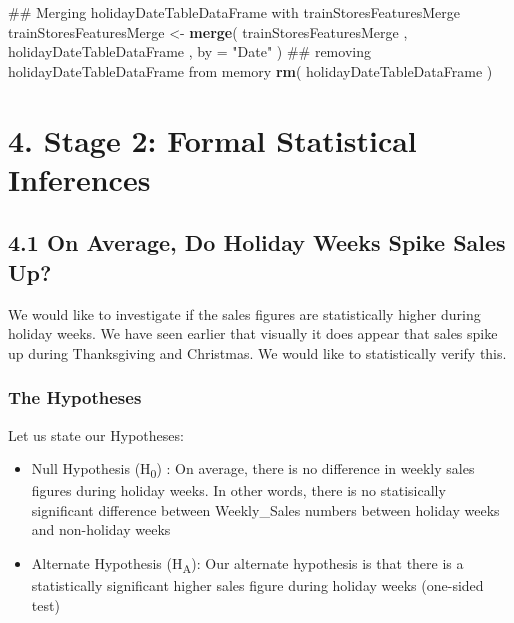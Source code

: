 \documentclass[]{article}
\newenvironment{Shaded}{\begin{snugshade}}{\end{snugshade}}
\newcommand{\KeywordTok}[1]{\textcolor[rgb]{0.13,0.29,0.53}{\textbf{{#1}}}}
\newcommand{\DataTypeTok}[1]{\textcolor[rgb]{0.13,0.29,0.53}{{#1}}}
\newcommand{\StringTok}[1]{\textcolor[rgb]{0.31,0.60,0.02}{{#1}}}
\newcommand{\NormalTok}[1]{{#1}}
\begin{document}
\begin{Shaded}
\begin{Highlighting}[]
\NormalTok{## Merging holidayDateTableDataFrame with trainStoresFeaturesMerge}
\NormalTok{trainStoresFeaturesMerge <-}\StringTok{ }
\StringTok{  }\KeywordTok{merge}\NormalTok{( trainStoresFeaturesMerge , holidayDateTableDataFrame , }\DataTypeTok{by =} \StringTok{"Date"} \NormalTok{)}
\NormalTok{## removing holidayDateTableDataFrame from memory}
\KeywordTok{rm}\NormalTok{( holidayDateTableDataFrame )}
\end{Highlighting}
\end{Shaded}

\pagebreak
\hfill \break
\hfill \break
\hfill \break
\hfill \break
\hfill \break
\hfill \break
\hfill \break
\hfill \break
\hfill \break
\hfill \break
\hfill \break
\hfill \break
\hfill \break
\hfill \break
\hfill \break
\hfill \break
\hfill \break
\hfill \break
\hfill \break
\hfill \break

\section{4. Stage 2: Formal Statistical
Inferences}\label{stage-2-formal-statistical-inferences}

\subsection{4.1 On Average, Do Holiday Weeks Spike Sales
Up?}\label{on-average-do-holiday-weeks-spike-sales-up}

We would like to investigate if the sales figures are statistically
higher during holiday weeks. We have seen earlier that visually it does
appear that sales spike up during Thanksgiving and Christmas. We would
like to statistically verify this.

\subsubsection{The Hypotheses}\label{the-hypotheses}

Let us state our Hypotheses:

\begin{itemize}
\itemsep1pt\parskip0pt
\item
  Null Hypothesis (H\textsubscript{0}) : On average, there is no
  difference in weekly sales figures during holiday weeks. In other
  words, there is no statisically significant difference between
  Weekly\_Sales numbers between holiday weeks and non-holiday weeks
\item
  Alternate Hypothesis (H\textsubscript{A}): Our alternate hypothesis is
  that there is a statistically significant higher sales figure during
  holiday weeks (one-sided test)
\end{itemize}
\end{document}
